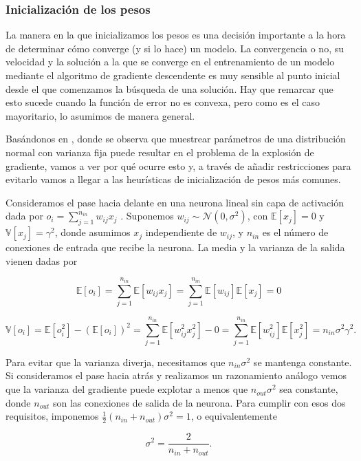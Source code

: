 \subsubsection{Inicialización de los pesos}\label{sec:inipesos}

La manera en la que inicializamos los pesos es una decisión importante a la hora de determinar cómo converge (y si lo hace) un modelo. La convergencia o no, su velocidad y la solución a la que se converge en el entrenamiento de un modelo mediante el algoritmo de gradiente descendente es muy sensible al punto inicial desde el que comenzamos la búsqueda de una solución. Hay que remarcar que esto sucede cuando la función de error no es convexa, pero como es el caso mayoritario, lo asumimos de manera general.  

Basándonos en \cite{stabilityProblem2}, donde se observa que muestrear parámetros de una distribución normal con varianza fija puede resultar en el problema de la explosión de gradiente, vamos a ver por qué ocurre esto y, a través de añadir restricciones para evitarlo vamos a llegar a las heurísticas de inicialización de pesos más comunes.

Consideramos el pase hacia delante en una neurona lineal sin capa de activación dada por $o_i = \sum_{j=1}^{n_{in}} w_{ij}x_j$ . Suponemos $w_{ij} \sim \mathcal{N}(0, \sigma^2)$, con $\mathbb{E}[x_j]=0$ y $\mathbb{V}[x_j]=\gamma^2$, donde asumimos $x_j$ independiente de $w_{ij}$, y $n_{in}$ es el número de conexiones de entrada que recibe la neurona. La media y la varianza de la salida vienen dadas por

$$\mathbb{E}[o_i]= \sum_{j=1}^{n_{in}} \mathbb{E}[w_{ij} x_j] = \sum_{j=1}^{n_{in}} \mathbb{E}[w_{ij}] \mathbb{E}[x_j]=0$$

$$\mathbb{V}[o_i] = \mathbb{E}[o_i^2] - (\mathbb{E}[o_i])^2 = \sum_{j=1}^{n_{in}} \mathbb{E}[w_{ij}^2x_j^2] - 0 = \sum_{j=1}^{n_{in}} \mathbb{E}[w_{ij}^2] \mathbb{E}[x_j^2] = n_{in} \sigma^2 \gamma^2.$$

Para evitar que la varianza diverja, necesitamos que $n_{in} \sigma^2$ se mantenga constante. Si consideramos el pase hacia atrás y realizamos un razonamiento análogo vemos que la varianza del gradiente puede explotar a menos que $n_{out} \sigma^2$ sea constante, donde $n_{out}$ son las conexiones de salida de la neurona. Para cumplir con esos dos requisitos, imponemos $\frac{1}{2}(n_{in}+n_{out}) \sigma^2 = 1$, o equivalentemente

$$\sigma^2= \frac{2}{n_{in}+n_{out}}.$$

